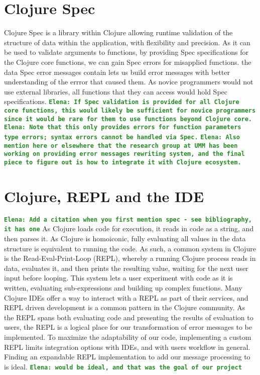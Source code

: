 \documentclass[12pt]{article}
\newcommand{\comment}[1]{{\bf \tt  {#1}}}
\newcommand{\emcomment}[1]{\textcolor{ForestGreen}{\comment{Elena: {#1}}}}
\begin{document}
\section{Clojure Spec}
Clojure Spec is a library within Clojure allowing runtime validation
of the structure of data within the application, with flexibility and precision.
As it can be used to validate arguments to functions, by providing Spec
 specifications for the Clojure core functions, we can gain Spec errors
 for misapplied functions. the data Spec error messages contain lets us build
 error messages with better understanding of the errror that caused them. 
As novice programmers would not use external libraries,
 all functions that they can access would hold Spec specifications.
\emcomment{If Spec validation is provided for all Clojure core functions, 
this would likely be sufficient for novice programmers since it would be 
rare for them to use functions beyond Clojure core.} 
\emcomment{Note that this only provides errors for function parameters 
type errors; syntax errors cannot be handled via Spec.}
\emcomment{Also mention here or elsewhere that the research group at UMM has been 
working on providing error messages rewriting system, and the final piece to figure
out is how to integrate it with Clojure ecosystem.}


\section{Clojure, REPL and the IDE}
\emcomment{Add a citation when you first mention spec - see bibliography, it has one}
As Clojure loads code for execution, it reads in code as a string,
and then parses it. As Clojure is homoiconic, fully evaluating all values in the data structure
is equivalent to running the code.
As such, a common system in Clojure is the Read-Eval-Print-Loop (REPL), whereby a running Clojure
process reads in data, evaluates it, and then prints the resulting value,
 waiting for the next user input before looping.
This system lets a user experiment with code as it is written,
 evaluating sub-expressions and building up complex functions.
Many Clojure IDEs offer a way to interact with a REPL as part of their services,
 and REPL driven development is a common pattern in the Clojure community.
 As the REPL spans both evaluating code and presenting the results of evaluation to users,
 the REPL is a logical place for our transformation of error messages to be implemented.
 To maximize the adaptability of our code, implementing a custom REPL limits integration
 options with IDEs, and with users workflow in general.
  Finding an expandable REPL implementation to add our message processing to
  is ideal. \emcomment{would be ideal, and that was the goal of our project}
\end{document}
